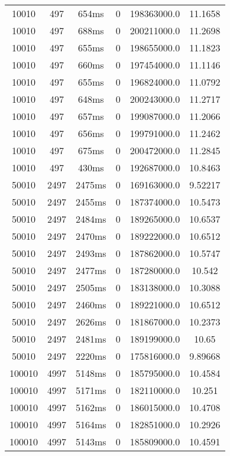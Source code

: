 \documentclass[./main.tex]{subfiles}
\begin{document}
\begin{table}
\begin{tabular}{ c | c | c | c | c | c }
        10010 & 497 & 654ms & 0 & 198363000.0 & 11.1658 \\
        10010 & 497 & 688ms & 0 & 200211000.0 & 11.2698 \\
        \rowcolor{lightgray} 10010 & 497 & 655ms & 0 & 198655000.0 & 11.1823 \\
        10010 & 497 & 660ms & 0 & 197454000.0 & 11.1146 \\
        10010 & 497 & 655ms & 0 & 196824000.0 & 11.0792 \\
        10010 & 497 & 648ms & 0 & 200243000.0 & 11.2717 \\
        10010 & 497 & 657ms & 0 & 199087000.0 & 11.2066 \\
        10010 & 497 & 656ms & 0 & 199791000.0 & 11.2462 \\
        10010 & 497 & 675ms & 0 & 200472000.0 & 11.2845 \\
        10010 & 497 & 430ms & 0 & 192687000.0 & 10.8463 \\
        \hline
        50010 & 2497 & 2475ms & 0 & 169163000.0 & 9.52217 \\
        \rowcolor{lightgray} 50010 & 2497 & 2455ms & 0 & 187374000.0 & 10.5473 \\
        50010 & 2497 & 2484ms & 0 & 189265000.0 & 10.6537 \\
        50010 & 2497 & 2470ms & 0 & 189222000.0 & 10.6512 \\
        50010 & 2497 & 2493ms & 0 & 187862000.0 & 10.5747 \\
        50010 & 2497 & 2477ms & 0 & 187280000.0 & 10.542 \\
        50010 & 2497 & 2505ms & 0 & 183138000.0 & 10.3088 \\
        50010 & 2497 & 2460ms & 0 & 189221000.0 & 10.6512 \\
        50010 & 2497 & 2626ms & 0 & 181867000.0 & 10.2373 \\
        50010 & 2497 & 2481ms & 0 & 189199000.0 & 10.65 \\
        50010 & 2497 & 2220ms & 0 & 175816000.0 & 9.89668 \\
        \hline
        100010 & 4997 & 5148ms & 0 & 185795000.0 & 10.4584 \\
        100010 & 4997 & 5171ms & 0 & 182110000.0 & 10.251 \\
        100010 & 4997 & 5162ms & 0 & 186015000.0 & 10.4708 \\
        100010 & 4997 & 5164ms & 0 & 182851000.0 & 10.2926 \\
        100010 & 4997 & 5143ms & 0 & 185809000.0 & 10.4591 \\

\end{tabular}
\end{table}
\end{document}
